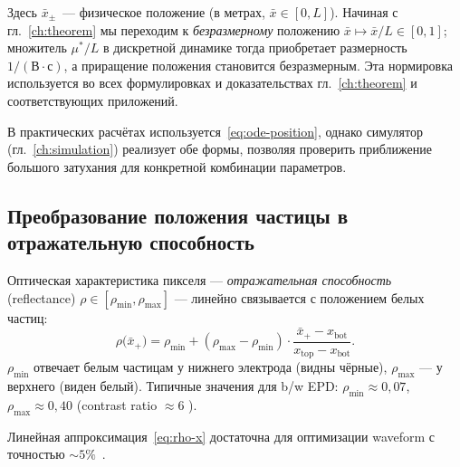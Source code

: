 \begin{remark}
Здесь $\bar{x}_\pm$~--- физическое положение (в метрах, $\bar{x} \in [0, L]$).
Начиная с гл.~\ref{ch:theorem} мы переходим к \emph{безразмерному}
положению $\bar{x} \mapsto \bar{x}/L \in [0, 1]$; множитель $\mu^{*}/L$
в дискретной динамике тогда приобретает размерность $1/(\text{В}\cdot\text{с})$, а
приращение положения становится безразмерным. Эта нормировка используется во
всех формулировках и доказательствах гл.~\ref{ch:theorem} и
соответствующих приложений.
\end{remark}

В практических расчётах используется~\eqref{eq:ode-position}, однако симулятор
(гл.~\ref{ch:simulation}) реализует обе формы, позволяя проверить
приближение большого затухания для конкретной комбинации параметров.

\subsection*{Преобразование положения частицы в отражательную способность}

Оптическая характеристика пикселя --- \emph{отражательная способность}
(reflectance) $\rho \in [\rho_{\min}, \rho_{\max}]$ — линейно связывается с
положением белых частиц:
\begin{equation}\label{eq:rho-x}
    \rho\bigl(\bar{x}_+\bigr) = \rho_{\min}
    + (\rho_{\max} - \rho_{\min}) \cdot
    \frac{\bar{x}_+ - x_{\mathrm{bot}}}{x_{\mathrm{top}} - x_{\mathrm{bot}}}.
\end{equation}
$\rho_{\min}$ отвечает белым частицам у нижнего электрода (видны чёрные),
$\rho_{\max}$ — у верхнего (виден белый). Типичные значения для b/w EPD:
$\rho_{\min} \approx 0{,}07$, $\rho_{\max} \approx 0{,}40$ (contrast
ratio $\approx 6$ \cite{yang2021_mechanisms}).

Линейная аппроксимация~\eqref{eq:rho-x} достаточна для оптимизации waveform с
точностью $\sim 5\%$~\cite{he2020_particle_activation, lin2024_low_power}.

